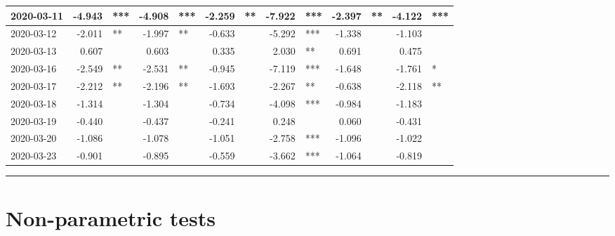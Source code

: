 \documentclass[
]{article}
\begin{document}
\begin{table}
\begin{tabular}[t]{l|r|l|r|l|r|l|r|l|r|l|r|l}
\hline
2020-03-11 & -4.943 & *** & -4.908 & *** & -2.259 & ** & -7.922 & *** & -2.397 & ** & -4.122 & ***\\
\hline
2020-03-12 & -2.011 & ** & -1.997 & ** & -0.633 &  & -5.292 & *** & -1.338 &  & -1.103 & \\
\hline
2020-03-13 & 0.607 &  & 0.603 &  & 0.335 &  & 2.030 & ** & 0.691 &  & 0.475 & \\
\hline
2020-03-16 & -2.549 & ** & -2.531 & ** & -0.945 &  & -7.119 & *** & -1.648 &  & -1.761 & *\\
\hline
2020-03-17 & -2.212 & ** & -2.196 & ** & -1.693 &  & -2.267 & ** & -0.638 &  & -2.118 & **\\
\hline
2020-03-18 & -1.314 &  & -1.304 &  & -0.734 &  & -4.098 & *** & -0.984 &  & -1.183 & \\
\hline
2020-03-19 & -0.440 &  & -0.437 &  & -0.241 &  & 0.248 &  & 0.060 &  & -0.431 & \\
\hline
2020-03-20 & -1.086 &  & -1.078 &  & -1.051 &  & -2.758 & *** & -1.096 &  & -1.022 & \\
\hline
2020-03-23 & -0.901 &  & -0.895 &  & -0.559 &  & -3.662 & *** & -1.064 &  & -0.819 & \\
\hline
\end{tabular}
\end{table}

\begin{center}\rule{0.5\linewidth}{0.5pt}\end{center}

\hypertarget{non-parametric-tests}{%
\section{Non-parametric tests}\label{non-parametric-tests}}
\end{document}
